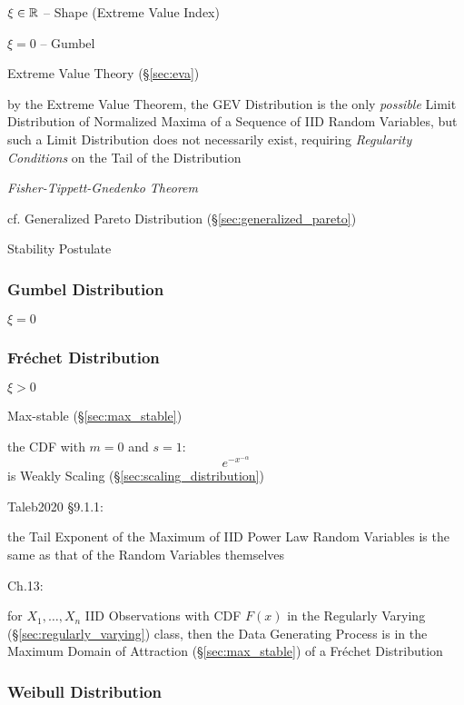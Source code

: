 $\xi \in \mathbb{R}$ -- Shape (Extreme Value Index)

$\xi = 0$ -- Gumbel

Extreme Value Theory (\S\ref{sec:eva})

by the Extreme Value Theorem, the GEV Distribution is the only \emph{possible}
Limit Distribution of Normalized Maxima of a Sequence of IID Random Variables,
but such a Limit Distribution does not necessarily exist, requiring
\emph{Regularity Conditions} on the Tail of the Distribution

\emph{Fisher-Tippett-Gnedenko Theorem}

cf. Generalized Pareto Distribution (\S\ref{sec:generalized_pareto})

Stability Postulate



\subsubsection{Gumbel Distribution}\label{sec:gumbel_distribution}

$\xi = 0$



\subsubsection{Fr\'echet Distribution}\label{sec:frechet_distribution}

$\xi > 0$

Max-stable (\S\ref{sec:max_stable})

the CDF with $m = 0$ and $s = 1$:
\[
  e^{-x^{-\alpha}}
\]
is Weakly Scaling (\S\ref{sec:scaling_distribution})

Taleb2020 \S 9.1.1:

the Tail Exponent of the Maximum of IID Power Law Random Variables is the same
as that of the Random Variables themselves

Ch.13:

for $X_1, \ldots, X_n$ IID Observations with CDF $F(x)$ in the Regularly Varying
(\S\ref{sec:regularly_varying}) class, then the Data Generating Process is in
the Maximum Domain of Attraction (\S\ref{sec:max_stable}) of a Fr\'echet
Distribution



\subsubsection{Weibull Distribution}\label{sec:weibull_distribution}

